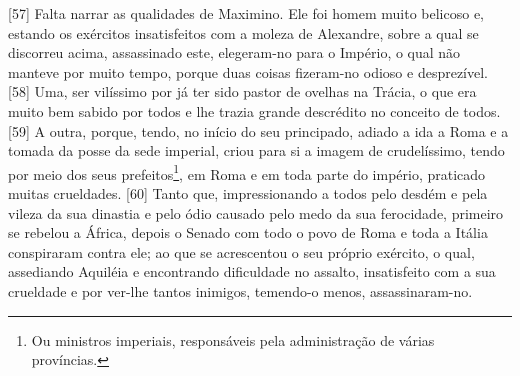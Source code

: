 {[}57{]} Falta narrar as qualidades de Maximino. Ele foi homem muito
belicoso e, estando os exércitos insatisfeitos com a moleza de
Alexandre, sobre a qual se discorreu acima, assassinado este,
elegeram-no para o Império, o qual não manteve por muito tempo, porque
duas coisas fizeram-no odioso e desprezível. {[}58{]} Uma, ser vilíssimo
por já ter sido pastor de ovelhas na Trácia, o que era muito bem sabido
por todos e lhe trazia grande descrédito no conceito de todos. {[}59{]}
A outra, porque, tendo, no início do seu principado, adiado a ida a Roma
e a tomada da posse da sede imperial, criou para si a imagem de
crudelíssimo, tendo por meio dos seus prefeitos\footnote{Ou ministros
  imperiais, responsáveis pela administração de várias províncias.}, em
Roma e em toda parte do império, praticado muitas crueldades. {[}60{]}
Tanto que, impressionando a todos pelo desdém e pela vileza da sua
dinastia e pelo ódio causado pelo medo da sua ferocidade, primeiro se
rebelou a África, depois o Senado com todo o povo de Roma e toda a
Itália conspiraram contra ele; ao que se acrescentou o seu próprio
exército, o qual, assediando Aquiléia e encontrando dificuldade no
assalto, insatisfeito com a sua crueldade e por ver-lhe tantos inimigos,
temendo-o menos, assassinaram-no.


